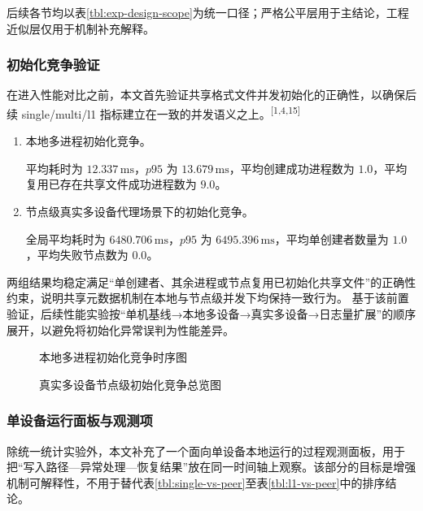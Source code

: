后续各节均以表\ref{tbl:exp-design-scope}为统一口径；严格公平层用于主结论，工程近似层仅用于机制补充解释。

\subsubsection{初始化竞争验证}\label{ux521dux59cbux5316ux7adeux4e89ux9a8cux8bc1}

在进入性能对比之前，本文首先验证共享格式文件并发初始化的正确性，以确保后续 single/multi/l1 指标建立在一致的并发语义之上。\textsuperscript{[1,4,15]}

\begin{enumerate}
\def\labelenumi{\arabic{enumi}.}
\item
  本地多进程初始化竞争。

  平均耗时为 \(12.337\,\mathrm{ms}\)，\(p95\) 为 \(13.679\,\mathrm{ms}\)，平均创建成功进程数为 \(1.0\)，平均复用已存在共享文件成功进程数为 \(9.0\)。
\item
  节点级真实多设备代理场景下的初始化竞争。

  全局平均耗时为 \(6480.706\,\mathrm{ms}\)，\(p95\) 为 \(6495.396\,\mathrm{ms}\)，平均单创建者数量为 \(1.0\)，平均失败节点数为 \(0.0\)。
\end{enumerate}

两组结果均稳定满足``单创建者、其余进程或节点复用已初始化共享文件''的正确性约束，说明共享元数据机制在本地与节点级并发下均保持一致行为。 基于该前置验证，后续性能实验按``单机基线→本地多设备→真实多设备→日志量扩展''的顺序展开，以避免将初始化异常误判为性能差异。

\begin{figure}[H]
\centering

\caption{本地多进程初始化竞争时序图}
\label{fig:init-race-local}
\end{figure}
\begin{figure}[H]
\centering

\caption{真实多设备节点级初始化竞争总览图}
\label{fig:init-race-l1}
\end{figure}

\subsubsection{单设备运行面板与观测项}\label{ux5355ux8bbeux5907ux8fd0ux884cux9762ux677fux4e0eux89c2ux6d4bux9879}

除统一统计实验外，本文补充了一个面向单设备本地运行的过程观测面板，用于把``写入路径---异常处理---恢复结果''放在同一时间轴上观察。该部分的目标是增强机制可解释性，不用于替代表\ref{tbl:single-vs-peer}至表\ref{tbl:l1-vs-peer}中的排序结论。

